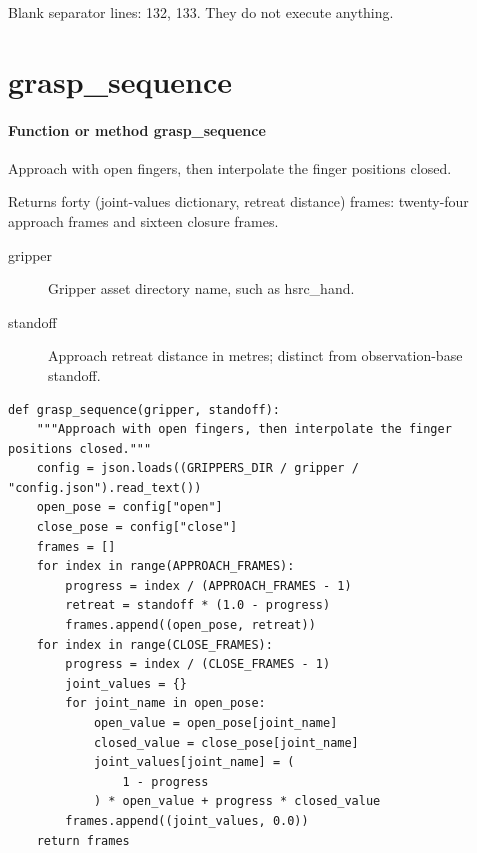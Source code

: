 \documentclass[11pt,a4paper]{book}
\begin{document}
Blank separator lines: 132, 133. They do not execute anything.

\section{grasp\_sequence}

\paragraph{Function or method grasp\_sequence}
Approach with open fingers, then interpolate the finger positions closed.

Returns forty (joint-values dictionary, retreat distance) frames: twenty-four approach frames and sixteen closure frames.

\begin{description}
\item[gripper] Gripper asset directory name, such as hsrc\_hand.
\item[standoff] Approach retreat distance in metres; distinct from observation-base standoff.
\end{description}

\begin{lstlisting}[firstnumber=134]
def grasp_sequence(gripper, standoff):
    """Approach with open fingers, then interpolate the finger positions closed."""
    config = json.loads((GRIPPERS_DIR / gripper / "config.json").read_text())
    open_pose = config["open"]
    close_pose = config["close"]
    frames = []
    for index in range(APPROACH_FRAMES):
        progress = index / (APPROACH_FRAMES - 1)
        retreat = standoff * (1.0 - progress)
        frames.append((open_pose, retreat))
    for index in range(CLOSE_FRAMES):
        progress = index / (CLOSE_FRAMES - 1)
        joint_values = {}
        for joint_name in open_pose:
            open_value = open_pose[joint_name]
            closed_value = close_pose[joint_name]
            joint_values[joint_name] = (
                1 - progress
            ) * open_value + progress * closed_value
        frames.append((joint_values, 0.0))
    return frames


\end{lstlisting}
\end{document}
